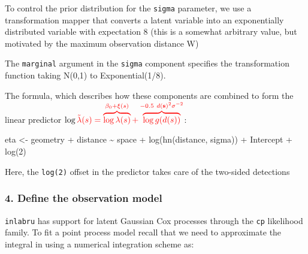 \documentclass[
  letterpaper,
  DIV=11,
  numbers=noendperiod]{scrartcl}
\newenvironment{Shaded}{\begin{snugshade}}{\end{snugshade}}
\newcommand{\DecValTok}[1]{\textcolor[rgb]{0.68,0.00,0.00}{#1}}
\newcommand{\FunctionTok}[1]{\textcolor[rgb]{0.28,0.35,0.67}{#1}}
\newcommand{\NormalTok}[1]{\textcolor[rgb]{0.00,0.23,0.31}{#1}}
\newcommand{\OtherTok}[1]{\textcolor[rgb]{0.00,0.23,0.31}{#1}}
\newcommand{\SpecialCharTok}[1]{\textcolor[rgb]{0.37,0.37,0.37}{#1}}
\begin{document}
\begin{tcolorbox}[enhanced jigsaw, coltitle=black, breakable, opacityback=0, colbacktitle=quarto-callout-note-color!10!white, leftrule=.75mm, opacitybacktitle=0.6, title=\textcolor{quarto-callout-note-color}{\faInfo}\hspace{0.5em}{Note}, titlerule=0mm, toptitle=1mm, bottomtitle=1mm, left=2mm, colback=white, arc=.35mm, colframe=quarto-callout-note-color-frame, rightrule=.15mm, bottomrule=.15mm, toprule=.15mm]

To control the prior distribution for the \texttt{sigma} parameter, we
use a transformation mapper that converts a latent variable into an
exponentially distributed variable with expectation 8 (this is a
somewhat arbitrary value, but motivated by the maximum observation
distance W)

The \texttt{marginal} argument in the \texttt{sigma} component specifies
the transformation function taking N(0,1) to Exponential(1/8).

\end{tcolorbox}

The formula, which describes how these components are combined to form
the linear predictor
\(\log \color{red}{\tilde{\lambda}(s)} = \overbrace{\log \lambda (s)}^{\beta_0 + \xi(s)} + \overbrace{\log \color{red}{g(d(s))}}^{-0.5~d(\mathbf{s})^2\sigma^{-2}}\):

\begin{Shaded}
\begin{Highlighting}[]
\NormalTok{eta }\OtherTok{\textless{}{-}}\NormalTok{ geometry }\SpecialCharTok{+}\NormalTok{ distance }\SpecialCharTok{\textasciitilde{}}\NormalTok{ space }\SpecialCharTok{+}
  \FunctionTok{log}\NormalTok{(}\FunctionTok{hn}\NormalTok{(distance, sigma)) }\SpecialCharTok{+}
\NormalTok{  Intercept }\SpecialCharTok{+} \FunctionTok{log}\NormalTok{(}\DecValTok{2}\NormalTok{) }
\end{Highlighting}
\end{Shaded}

Here, the \texttt{log(2)} offset in the predictor takes care of the
two-sided detections

\subsubsection{4. Define the observation
model}\label{define-the-observation-model}

\texttt{inlabru} has support for latent Gaussian Cox processes through
the \texttt{cp} likelihood family. To fit a point process model recall
that we need to approximate the integral in using a numerical
integration scheme as:
\end{document}
